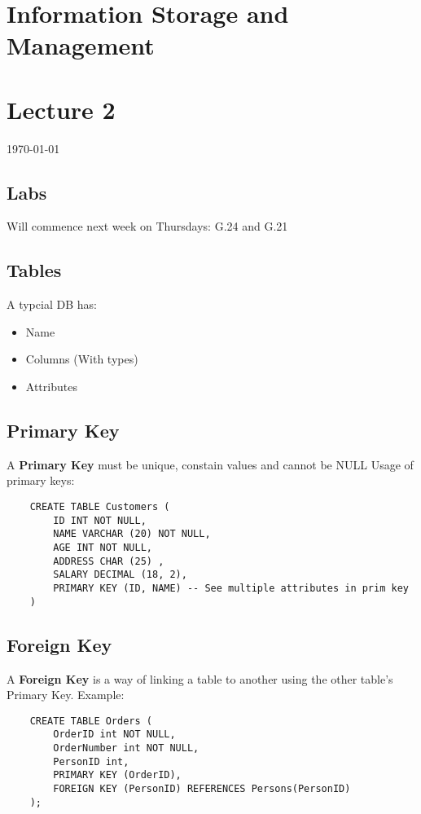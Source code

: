 \documentclass[12pt]{article}
\begin{document}
{\centering
\section*{Information Storage and Management}
\section*{Lecture 2}
\indent\today
}

\subsection*{Labs}
Will commence next week on Thursdays: G.24 and G.21

\subsection*{Tables}
A typcial DB has:
\begin{itemize}
    \item Name
    \item Columns (With types)
    \item Attributes
\end{itemize}
\subsection*{Primary Key}
A \textbf{Primary Key} must be unique, constain values and cannot be NULL
\newline
\newline
Usage of primary keys:
\begin{lstlisting}
    CREATE TABLE Customers (
        ID INT NOT NULL, 
        NAME VARCHAR (20) NOT NULL, 
        AGE INT NOT NULL, 
        ADDRESS CHAR (25) , 
        SALARY DECIMAL (18, 2), 
        PRIMARY KEY (ID, NAME) -- See multiple attributes in prim key 
    )
\end{lstlisting}
\subsection*{Foreign Key}
A \textbf{Foreign Key} is a way of linking a table to another using the other table's Primary Key. Example:
\begin{lstlisting}
    CREATE TABLE Orders (
        OrderID int NOT NULL,
        OrderNumber int NOT NULL,
        PersonID int,
        PRIMARY KEY (OrderID),
        FOREIGN KEY (PersonID) REFERENCES Persons(PersonID)
    ); 
\end{lstlisting}
\end{document}
